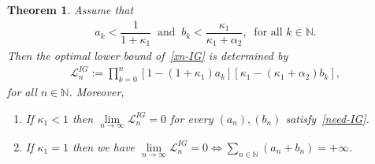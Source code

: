 \documentclass[a4paper, 11pt]{article}
\newtheorem{theorem}{Theorem}[section]
\begin{document}
\begin{theorem}\label{theo-L-IG}
Assume that  
\begin{align}\label{need-IG}
			a_k < \dfrac{1}{1 + \kappa_1} \ \text{ and } \ b_k < \dfrac{\kappa_1}{\kappa_1 + \alpha_2}, \ \text{ for all } k \in \mathbb{N}.
		\end{align}			
Then the optimal lower bound of~\eqref{xn-IG} is determined by
			\begin{align}\label{Ln-IG}
				\mathcal{L}_n^{IG} := \displaystyle \prod_{k=0}^n  [1 - (1+ \kappa_1)a_k][\kappa_1 - (\kappa_1 + \alpha_2)b_k],
			\end{align}
			for all $n \in \mathbb{N}$. Moreover, 
			\begin{enumerate}
				\item [(i)] If $\kappa_1 < 1$ then $\displaystyle \lim\limits_{n\to \infty} \mathcal{L}_n^{IG} = 0$ for every $(a_n), (b_n)$ satisfy~\eqref{need-IG}.
				\item [(ii)] If $\kappa_1 = 1$ then we have $\displaystyle \lim\limits_{n\to \infty} \mathcal{L}_n^{IG} = 0 \Longleftrightarrow \sum_{n \in \mathbb{N}} (a_n + b_n) = +\infty$. 
			\end{enumerate}
		\end{theorem}
\end{document}
